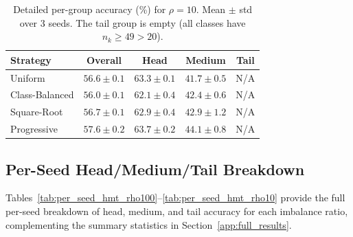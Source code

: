 \documentclass[12pt,a4paper]{article}
\begin{document}
\begin{table}[H]
    \centering
    \caption{Detailed per-group accuracy (\%) for $\rho = 10$. Mean $\pm$ std over 3 seeds. The tail group is empty (all classes have $n_k \geq 49 > 20$).}
    \label{tab:full_hmt_rho10}
    \begin{tabular}{lcccc}
        \toprule
        \textbf{Strategy} & \textbf{Overall} & \textbf{Head} & \textbf{Medium} & \textbf{Tail} \\
        \midrule
        Uniform        & $56.6 \pm 0.1$ & $63.3 \pm 0.1$ & $41.7 \pm 0.5$ & N/A \\
        Class-Balanced & $56.0 \pm 0.1$ & $62.1 \pm 0.4$ & $42.4 \pm 0.6$ & N/A \\
        Square-Root    & $56.7 \pm 0.1$ & $62.9 \pm 0.4$ & $42.9 \pm 1.2$ & N/A \\
        Progressive    & $\mathbf{57.6 \pm 0.2}$ & $\mathbf{63.7 \pm 0.2}$ & $\mathbf{44.1 \pm 0.8}$ & N/A \\
        \bottomrule
    \end{tabular}
\end{table}

\subsection{Per-Seed Head/Medium/Tail Breakdown}
\label{app:per_seed_hmt}

Tables~\ref{tab:per_seed_hmt_rho100}--\ref{tab:per_seed_hmt_rho10} provide the full per-seed breakdown of head, medium, and tail accuracy for each imbalance ratio, complementing the summary statistics in Section~\ref{app:full_results}.
\end{document}
